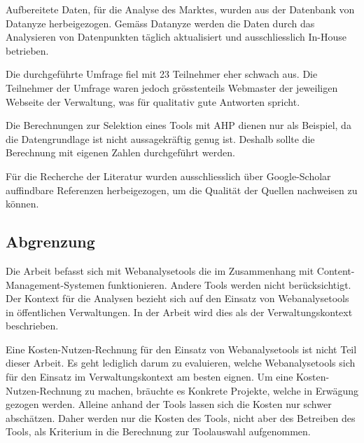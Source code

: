 Aufbereitete Daten, für die Analyse des Marktes, wurden aus der Datenbank von Datanyze \parencite{datanyzeSwitzerlandWebanalytics} herbeigezogen. Gemäss Datanyze \parencite{datanyzeFAQ} werden die Daten durch das Analysieren von Datenpunkten täglich aktualisiert und ausschliesslich In-House betrieben.

Die durchgeführte Umfrage fiel mit 23 Teilnehmer eher schwach aus. Die Teilnehmer der Umfrage waren jedoch grösstenteils Webmaster der jeweiligen Webseite der Verwaltung, was für qualitativ gute Antworten spricht.

Die Berechnungen zur Selektion eines Tools mit AHP dienen nur als Beispiel, da die Datengrundlage ist nicht aussagekräftig genug ist. Deshalb sollte die Berechnung mit eigenen Zahlen durchgeführt werden. 

Für die Recherche der Literatur wurden ausschliesslich über Google-Scholar auffindbare Referenzen herbeigezogen, um die Qualität der Quellen nachweisen zu können.

\subsection{Abgrenzung}
Die Arbeit befasst sich mit Webanalysetools die im Zusammenhang mit Content-Management-Systemen funktionieren. Andere Tools werden nicht berücksichtigt. Der Kontext für die Analysen bezieht sich auf den Einsatz von Webanalysetools in öffentlichen Verwaltungen. In der Arbeit wird dies als der Verwaltungskontext beschrieben. 

Eine Kosten-Nutzen-Rechnung für den Einsatz von Webanalysetools ist nicht Teil dieser Arbeit. Es geht lediglich darum zu evaluieren, welche Webanalysetools sich für den Einsatz im Verwaltungskontext am besten eignen. Um eine Kosten-Nutzen-Rechnung zu machen, bräuchte es Konkrete Projekte, welche in Erwägung gezogen werden. Alleine anhand der Tools lassen sich die Kosten nur schwer abschätzen. Daher werden nur die Kosten des  Tools, nicht aber des Betreiben des Tools, als Kriterium in die Berechnung zur Toolauswahl aufgenommen. 